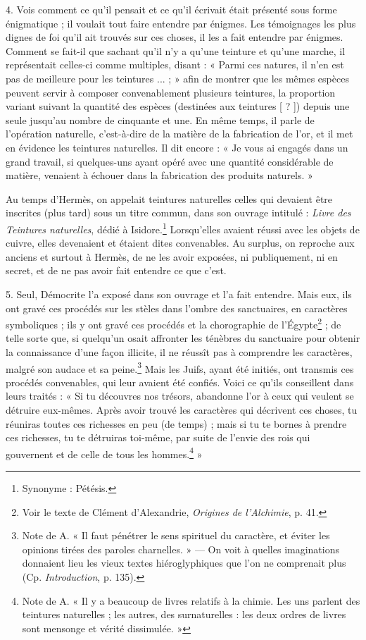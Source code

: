\documentclass[landscape, a4paper, 11pt, oneside, polutonikogreek, french]{article}
\begin{document}
4. Vois comment ce qu'il pensait et ce qu'il écrivait était présenté sous forme énigmatique ; il voulait tout faire entendre par énigmes. Les témoignages les plus dignes de foi qu'il ait trouvés sur ces choses, il les a fait entendre par énigmes. Comment se fait-il que sachant qu'il n'y a qu'une teinture et qu'une marche, il représentait celles-ci comme multiples, disant : « Parmi ces natures, il n'en est pas de meilleure pour les teintures ... ; » afin de montrer que les mêmes espèces peuvent servir à composer convenablement plusieurs teintures, la proportion variant suivant la quantité des espèces (destinées aux teintures [ ? ]) depuis une seule jusqu'au nombre de cinquante et une. En même temps, il parle de l'opération naturelle, c'est-à-dire de la matière de la fabrication de l'or, et il met en évidence les teintures naturelles. Il dit encore : « Je vous ai engagés dans un grand travail, si quelques-uns ayant opéré avec une quantité considérable de matière, venaient à échouer dans la fabrication des produits naturels. »

Au temps d'Hermès, on appelait teintures naturelles celles qui devaient être inscrites (plus tard) sous un titre commun, dans son ouvrage intitulé : \emph{Livre des Teintures naturelles}, dédié à Isidore.\footnote{Synonyme : Pétésis.} Lorsqu'elles avaient réussi avec les objets de cuivre, elles devenaient et étaient dites convenables. Au surplus, on reproche aux anciens et surtout à Hermès, de ne les avoir exposées, ni publiquement, ni en secret, et de ne pas avoir fait entendre ce que c'est.

5. Seul, Démocrite l'a exposé dans son ouvrage et l'a fait entendre. Mais eux, ils ont gravé ces procédés sur les stèles dans l'ombre des sanctuaires, en caractères symboliques ; ils y ont gravé ces procédés et la chorographie de l'Égypte\footnote{Voir le texte de Clément d'Alexandrie, \emph{Origines de l'Alchimie}, p. 41.} ; de telle sorte que, si quelqu'un osait affronter les ténèbres du sanctuaire pour obtenir la connaissance d'une façon illicite, il ne réussît pas à comprendre les caractères, malgré son audace et sa peine.\footnote{Note de A. « Il faut pénétrer le sens spirituel du caractère, et éviter les opinions tirées des paroles charnelles. » --- On voit à quelles imaginations donnaient lieu les vieux textes hiéroglyphiques que l'on ne comprenait plus (Cp. \emph{Introduction}, p. 135).} Mais les Juifs, ayant été initiés, ont transmis ces procédés convenables, qui leur avaient été confiés. Voici ce qu'ils conseillent dans leurs traités : « Si tu découvres nos trésors, abandonne l'or à ceux qui veulent se détruire eux-mêmes. Après avoir trouvé les caractères qui décrivent ces choses, tu réuniras toutes ces richesses en peu (de temps) ; mais si tu te bornes à prendre ces richesses, tu te détruiras toi-même, par suite de l'envie des rois qui gouvernent et de celle de tous les hommes.\footnote{Note de A. « Il y a beaucoup de livres relatifs à la chimie. Les uns parlent des teintures naturelles ; les autres, des surnaturelles : les deux ordres de livres sont mensonge et vérité dissimulée. »} »
\end{document}
